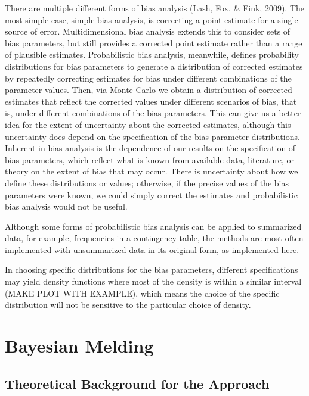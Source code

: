 \documentclass[12pt,twoside]{smiththesis}
\begin{document}
There are multiple different forms of bias analysis (Lash, Fox, \& Fink, 2009). The most simple case, simple bias analysis, is correcting a point estimate for a single source of error. Multidimensional bias analysis extends this to consider sets of bias parameters, but still provides a corrected point estimate rather than a range of plausible estimates. Probabilistic bias analysis, meanwhile, defines probability distributions for bias parameters to generate a distribution of corrected estimates by repeatedly correcting estimates for bias under different combinations of the parameter values. Then, via Monte Carlo we obtain a distribution of corrected estimates that reflect the corrected values under different scenarios of bias, that is, under different combinations of the bias parameters. This can give us a better idea for the extent of uncertainty about the corrected estimates, although this uncertainty does depend on the specification of the bias parameter distributions. Inherent in bias analysis is the dependence of our results on the specification of bias parameters, which reflect what is known from available data, literature, or theory on the extent of bias that may occur. There is uncertainty about how we define these distributions or values; otherwise, if the precise values of the bias parameters were known, we could simply correct the estimates and probabilistic bias analysis would not be useful.

Although some forms of probabilistic bias analysis can be applied to summarized data, for example, frequencies in a contingency table, the methods are most often implemented with unsummarized data in its original form, as implemented here.

In choosing specific distributions for the bias parameters, different specifications may yield density functions where most of the density is within a similar interval (MAKE PLOT WITH EXAMPLE), which means the choice of the specific distribution will not be sensitive to the particular choice of density.

\hypertarget{bayesian-melding}{%
\section{Bayesian Melding}\label{bayesian-melding}}

\hypertarget{theoretical-background-for-the-approach}{%
\subsection{Theoretical Background for the Approach}\label{theoretical-background-for-the-approach}}
\end{document}
